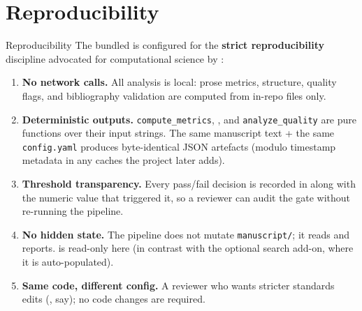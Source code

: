 \documentclass[
  ignorenonframetext,
]{beamer}
\author{\texorpdfstring{}{}}
\date{}
\providecommand{\tightlist}{%
  \setlength{\itemsep}{0pt}\setlength{\parskip}{0pt}}
\begin{document}
\section{Reproducibility}\label{sec:reproducibility}

\begin{frame}{Reproducibility}
The bundled  is configured for the
\textbf{strict reproducibility} discipline advocated for computational
science by :

\begin{enumerate}
\tightlist
\item
  \textbf{No network calls.} All analysis is local: prose metrics,
  structure, quality flags, and bibliography validation are computed
  from in-repo files only.
\item
  \textbf{Deterministic outputs.} \texttt{compute\_metrics},
  , and \texttt{analyze\_quality} are pure
  functions over their input strings. The same manuscript text + the
  same \texttt{config.yaml} produces byte-identical JSON artefacts
  (modulo timestamp metadata in any caches the project later adds).
\item
  \textbf{Threshold transparency.} Every pass/fail decision is recorded
  in  along with the numeric value that
  triggered it, so a reviewer can audit the gate without re-running the
  pipeline.
\item
  \textbf{No hidden state.} The pipeline does not mutate
  \texttt{manuscript/}; it reads and reports.
   is read-only here (in contrast with
  the optional search add-on, where it is auto-populated).
\item
  \textbf{Same code, different config.} A reviewer who wants stricter
  standards edits 
  (, say); no code
  changes are required.
\end{enumerate}
\end{frame}
\end{document}
